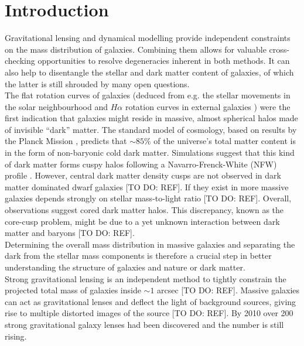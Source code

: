 \section{Introduction}

Gravitational lensing and dynamical modelling provide independent constraints on the mass distribution of galaxies. Combining them allows for valuable cross-checking opportunities to resolve degeneracies inherent in both methods. It can also help to disentangle the stellar and dark matter content of galaxies, of which the latter is still shrouded by many open questions.\\

The flat rotation curves of galaxies (deduced from e.g. the stellar movements in the solar neighbourhood \citep{1932BAN.....6..249O} and $H\alpha$ rotation curves in external galaxies \citep{1978ApJ...225L.107R}) were the first indication that galaxies might reside in massive, almost spherical halos made of invisible ``dark'' matter. The standard model of cosmology, based on results by the Planck Mission \citep{WMAP5cosm}, predicts that $\sim 85\%$ of the universe's total matter content is in the form of non-baryonic cold dark matter. Simulations suggest that this kind of dark matter forms cuspy halos following a Navarro-Frenck-White (NFW) profile \citep{NFW96}. However, central dark matter density cusps are not observed in dark matter dominated dwarf galaxies [TO DO: REF]. If they exist in more massive galaxies depends strongly on stellar mass-to-light ratio [TO DO: REF]. Overall, observations suggest cored dark matter halos. This discrepancy, known as the core-cusp problem, might be due to a yet unknown interaction between dark matter and baryons [TO DO: REF].\\

Determining the overall mass distribution in massive galaxies and separating the dark from the stellar mass components is therefore a crucial step in better understanding the structure of galaxies and nature or dark matter.\\

Strong gravitational lensing is an independent method to tightly constrain the projected total mass of galaxies inside $\sim 1$ arcsec [TO DO: REF]. Massive galaxies can act as gravitational lenses and deflect the light of background sources, giving rise to multiple distorted images of the source [TO DO: REF]. By 2010 over 200 strong gravitational galaxy lenses had been discovered \citep{2010ARA&A..48...87T} and the number is still rising.\\

